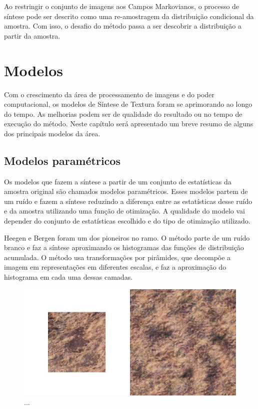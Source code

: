 
Ao restringir o conjunto de imagens aos
Campos Markovianos, o processo de síntese
pode ser descrito como uma re-amostragem
da distribuição condicional da amostra.
Com isso, o desafio do método passa a ser 
descobrir a distribuição a partir
da amostra.


\chapter{Modelos}

Com o crescimento da área de processamento
de imagens e do poder computacional,
os modelos de Síntese de Textura foram
se aprimorando ao longo do tempo.
As melhorias podem ser de qualidade
do resultado ou no tempo de 
execução do método. Neste capítulo
será apresentado um breve resumo de
alguns dos principais modelos
da área.



\section{Modelos paramétricos}

Os modelos que fazem a síntese a partir
de um conjunto de estatísticas da amostra
original são chamados modelos paramétricos.
Esses modelos partem de um ruído e fazem
a síntese reduzindo
a diferença entre as estatísticas desse
ruído e da amostra utilizando uma função de 
otimização.
A qualidade do modelo vai depender do
conjunto de estatísticas escolhido
e do tipo de otimização utilizado.


Heegen e Bergen \cite{Heeger1995} foram
um dos pioneiros no ramo. O método
parte de um ruído branco e faz a síntese
aproximando os histogramas das funções
de distribuição acumulada.
O método usa transformações
por pirâmides, que decompõe a imagem
em representações em diferentes escalas,
e faz a aproximação do histograma
em cada uma dessas camadas.

\begin{figure}[!ht]
	\centering
	\includegraphics[width=\linewidth*2/3]{files/assets/articles/bergen.png}
	\caption{...}
	\label{img:preview}
\end{figure}

